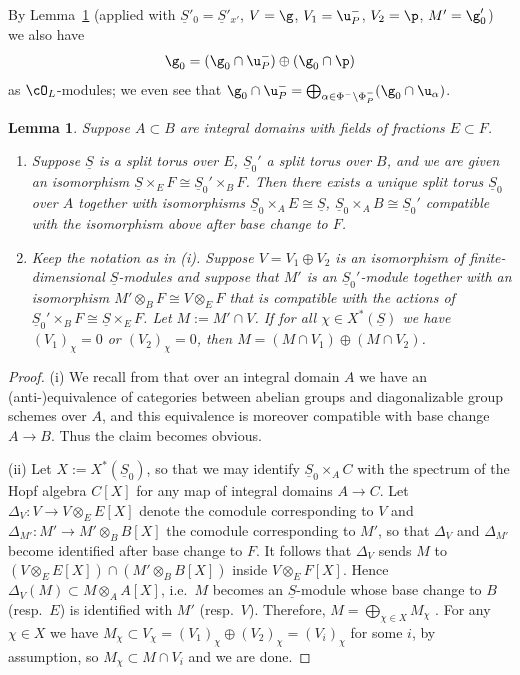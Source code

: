 \documentclass[a4paper]{amsart}
\numberwithin{equation}{section}
\newtheorem{lem}[thm]{Lemma}
\theoremstyle{remark}
\theoremstyle{definition}
\newcommand{\alggrp}[1]{\underline{#1}}
\begin{document}
By Lemma~\ref{lm:splitting} (applied with $\alggrp S'_0 = \alggrp S'_{x'}$, $V = \g$, $V_1 = \u_{P}^-$, $V_2 = \p$, $M' = \g'_0$) we also have
\begin{equation}\label{eq:g0-decomp}
  \g_0 = (\g_0 \cap \u_{P}^-) \oplus (\g_0 \cap \p)
\end{equation}
as $\cO_{L}$-modules;
we even see that $\g_0 \cap \u_{P}^- = \bigoplus_{\alpha \in \Phi^-\setminus \Phi_P^-} (\g_0 \cap \u_\alpha)$.

\begin{lem}\label{lm:splitting}
  Suppose $A \subset B$ are integral domains with fields of fractions $E \subset F$.

  \begin{enumerate}
  \item Suppose $\alggrp S$ is a split torus over $E$, $\alggrp S_0'$ a split torus over $B$, and we are given an isomorphism
    $\alggrp S \times_E F \cong \alggrp S_0' \times_{B} F$. Then there exists a unique split torus $\alggrp S_0$ over $A$
    together with isomorphisms $\alggrp S_0 \times_{A} E \cong \alggrp S$, $\alggrp S_0 \times_A B \cong \alggrp S_0'$ compatible with the 
    isomorphism above after base change to $F$.
  \item Keep the notation as in (i). 
    Suppose $V = V_1 \oplus V_2$ is an isomorphism of finite-dimensional $\alggrp S$-modules and suppose that
    $M'$ is an $\alggrp S_0'$-module together with an isomorphism $M' \otimes_B F \cong V \otimes_E F$ that is compatible with 
    the actions of $\alggrp S_0' \times_{B} F \cong \alggrp S \times_E F$.
    Let $M := M' \cap V$. If for all $\chi \in X^*(\alggrp S)$ we have $(V_1)_\chi = 0$ or $(V_2)_\chi = 0$, then 
    $M = (M \cap V_1) \oplus (M \cap V_2)$.
  \end{enumerate}
\end{lem}

\begin{proof}
  (i) We recall from \cite[\S I.2.5]{Jantzen} that over an integral domain $A$ we have an (anti-)equivalence of categories
  between abelian groups and diagonalizable group schemes over $A$, and this equivalence is 
  moreover compatible with base change $A \to B$. Thus the claim becomes obvious.

  (ii) Let $X := X^*(\alggrp S_0)$, so that we may identify $\alggrp S_0 \times_A C$ with the spectrum of the Hopf algebra $C[X]$ for any map of
  integral domains $A \to C$. Let $\Delta_V \colon V \to V \otimes_E E[X]$ denote the comodule corresponding to $V$ and
  $\Delta_{M'} \colon M' \to M' \otimes_B B[X]$ the comodule corresponding to $M'$, so that $\Delta_V$ and $\Delta_{M'}$ become
  identified after base change to $F$. It follows that $\Delta_V$ sends $M$ to $(V \otimes_E E[X]) \cap (M' \otimes_B B[X])$
  inside $V \otimes_E F[X]$. Hence $\Delta_V(M) \subset M \otimes_A A[X]$, i.e.\ $M$ becomes an $\alggrp S$-module whose
  base change to $B$ (resp.\ $E$) is identified with $M'$ (resp.\ $V$). Therefore, $M = \bigoplus_{\chi \in X} M_\chi$ \cite[\S I.2.11]{Jantzen}.
  For any $\chi \in X$ we have $M_\chi \subset V_\chi = (V_1)_\chi \oplus (V_2)_\chi = (V_i)_\chi$ for some $i$, by assumption,
  so $M_\chi \subset M \cap V_i$ and we are done.
\end{proof}
\end{document}
